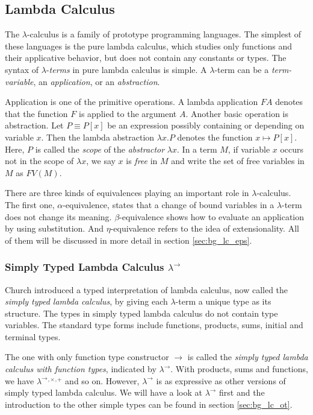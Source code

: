 \clearpage
\subsection{Lambda Calculus}
\label{sec:bg_lc}
The $ \lambda $-calculus is a family of prototype programming languages. The simplest of these languages is the pure lambda calculus, which studies only functions and their applicative behavior, but does not contain any constants or types. The syntax of $ \lambda $-\emph{terms} in pure lambda calculus is simple. A $ \lambda $-term can be a \emph{term-variable}, an \emph{application}, or an \emph{abstraction}.

Application is one of the primitive operations. A lambda application $ F A $ denotes that the function $ F $ is applied to the argument $ A $. Another basic operation is abstraction. Let $ P \equiv P[x] $ be an expression possibly containing or depending on variable $ x $. Then the lambda abstraction $ \lambda x.P $ denotes the function $ x \mapsto P[x] $. Here, $ P $ is called the \emph{scope} of the \emph{abstractor} $ \lambda x $. In a term $ M $, if variable $ x $ occurs not in the scope of $ \lambda x $, we say $ x $ is \emph{free} in $ M $ and write the set of free variables in $ M $ as $ FV(M) $.

There are three kinds of equivalences playing an important role in $ \lambda $-calculus. The first one, $ \alpha $-equivalence, states that a change of bound variables in a $ \lambda $-term does not change its meaning. $ \beta $-equivalence shows how to evaluate an application by using substitution. And $ \eta $-equivalence refers to the idea of extensionality. All of them will be discussed in more detail in section \ref{sec:bg_lc_eps}.


\subsubsection{Simply Typed Lambda Calculus $ \lambda ^\to $}
\label{sec:bg_lc_stlc}
Church introduced a typed interpretation of lambda calculus, now called the \emph{simply typed lambda calculus}, by giving each $ \lambda $-term a unique type as its structure. The types in simply typed lambda calculus do not contain type variables. The standard type forms include functions, products, sums, initial and terminal types.

The one with only function type constructor $ \to $ is called the \emph{simply typed lambda calculus with function types}, indicated by $ \lambda ^\to $. With products, sums and functions, we have $ \lambda ^\to{}^,{}^\times{}^,{}^+ $ and so on. However, $ \lambda ^\to $ is as expressive as other versions of simply typed lambda calculus. We will have a look at $ \lambda ^\to $ first and the introduction to the other simple types can be found in section \ref{sec:bg_lc_ot}.

